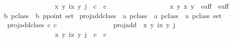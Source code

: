 \begin{isabellebody}
\ \ \ \ \ \ \ \ \ \ \ \ \ \ \ \ {\isacharparenleft}{\isacharparenleft}{\isacharparenleft}x\ y\ i{\isacharparenright}{\isacharcomma}{\isacharparenleft}{\isacharparenleft}x\ y\ j{\isacharparenright}{\isacharparenright}\ {\isasymin}\ c\ {\isasymtimes}\ c\ {\isasymand}\ \isanewline
\ \ \ \ \ \ \ \ \ \ \ \ \ \ \ \ {\isacharparenleft}{\isacharparenleft}x\ y\ {\isacharparenleft}x\ y\ {\isasymin}\ e{\isacharprime}{\isacharunderscore}aff{\isacharunderscore}{}\ {\isasymunion}\ e{\isacharprime}{\isacharunderscore}aff{\isacharunderscore}{}{\isacharbraceright}\ {\isachardoublequoteclose}\isanewline
\isanewline
{}\isamarkupfalse%
\ {\isacharparenleft}{\isacharprime}b{\isacharparenright}\ pclass\ {\isacharequal}\ {\isacartoucheopen}{\isacharparenleft}{\isacharprime}b{\isacharparenright}\ ppoint\ set{\isacartoucheclose}\isanewline
\isanewline
{}\isamarkupfalse%
\ proj{\isacharunderscore}add{\isacharunderscore}class\ {\isacharcolon}{\isacharcolon}\ {\isachardoublequoteopen}{\isacharparenleft}{\isacharprime}a{\isacharparenright}\ pclass\ {\isasymRightarrow}\ {\isacharparenleft}{\isacharprime}a{\isacharparenright}\ pclass\ {\isasymRightarrow}\ {\isacharparenleft}{\isacharprime}a{\isacharparenright}\ pclass\ set{\isachardoublequoteclose}\isanewline
{}\ \isanewline
\ \ {\isachardoublequoteopen}proj{\isacharunderscore}add{\isacharunderscore}class\ c\ c\ {\isacharequal}\ \ \ \ \ \ \ \isanewline
\ \ \ \ \ \ \ \ {\isacharparenleft}proj{\isacharunderscore}add\ {\isacharbackquote}\ {\isacharbraceleft}{\isacharparenleft}{\isacharparenleft}{\isacharparenleft}x\ y\ i{\isacharparenright}{\isacharcomma}{\isacharparenleft}{\isacharparenleft}x\ y\ j{\isacharparenright}{\isacharparenright}{\isachardot}\ \isanewline
\ \ \ \ \ \ \ \ \ \ \ \ \ \ \ \ {\isacharparenleft}{\isacharparenleft}{\isacharparenleft}x\ y\ i{\isacharparenright}{\isacharcomma}{\isacharparenleft}{\isacharparenleft}x\ y\ j{\isacharparenright}{\isacharparenright}\ {\isasymin}\ c\ {\isasymtimes}\ c\ {\isasymand}\ \isanewline

\end{isabellebody}
